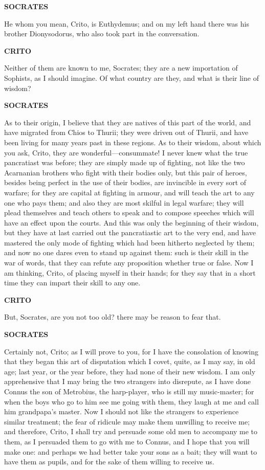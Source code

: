 \documentclass[11pt,letter]{article}
\begin{document}
\par \textbf{SOCRATES}
\par   He whom you mean, Crito, is Euthydemus; and on my left hand there was his brother Dionysodorus, who also took part in the conversation.

\par \textbf{CRITO}
\par   Neither of them are known to me, Socrates; they are a new importation of Sophists, as I should imagine. Of what country are they, and what is their line of wisdom?

\par \textbf{SOCRATES}
\par   As to their origin, I believe that they are natives of this part of the world, and have migrated from Chios to Thurii; they were driven out of Thurii, and have been living for many years past in these regions. As to their wisdom, about which you ask, Crito, they are wonderful—consummate! I never knew what the true pancratiast was before; they are simply made up of fighting, not like the two Acarnanian brothers who fight with their bodies only, but this pair of heroes, besides being perfect in the use of their bodies, are invincible in every sort of warfare; for they are capital at fighting in armour, and will teach the art to any one who pays them; and also they are most skilful in legal warfare; they will plead themselves and teach others to speak and to compose speeches which will have an effect upon the courts. And this was only the beginning of their wisdom, but they have at last carried out the pancratiastic art to the very end, and have mastered the only mode of fighting which had been hitherto neglected by them; and now no one dares even to stand up against them:  such is their skill in the war of words, that they can refute any proposition whether true or false. Now I am thinking, Crito, of placing myself in their hands; for they say that in a short time they can impart their skill to any one.

\par \textbf{CRITO}
\par   But, Socrates, are you not too old? there may be reason to fear that.

\par \textbf{SOCRATES}
\par   Certainly not, Crito; as I will prove to you, for I have the consolation of knowing that they began this art of disputation which I covet, quite, as I may say, in old age; last year, or the year before, they had none of their new wisdom. I am only apprehensive that I may bring the two strangers into disrepute, as I have done Connus the son of Metrobius, the harp-player, who is still my music-master; for when the boys who go to him see me going with them, they laugh at me and call him grandpapa's master. Now I should not like the strangers to experience similar treatment; the fear of ridicule may make them unwilling to receive me; and therefore, Crito, I shall try and persuade some old men to accompany me to them, as I persuaded them to go with me to Connus, and I hope that you will make one:  and perhaps we had better take your sons as a bait; they will want to have them as pupils, and for the sake of them willing to receive us.
\end{document}
